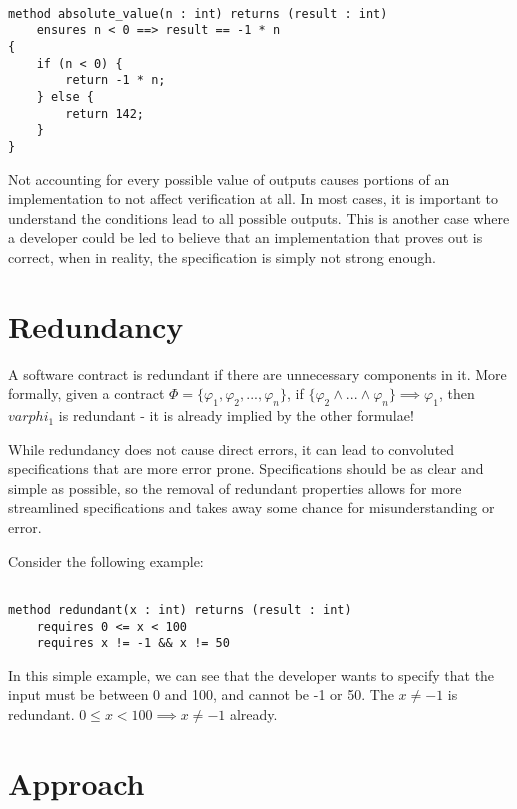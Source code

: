 \documentclass{article}
\begin{document}
\begin{lstlisting}

method absolute_value(n : int) returns (result : int)
    ensures n < 0 ==> result == -1 * n
{
    if (n < 0) {
        return -1 * n;
    } else {
        return 142;
    }
}

\end{lstlisting}

Not accounting for every possible value of outputs causes portions of an implementation to not affect verification at all. In
most cases, it is important to understand the conditions lead to all possible outputs. This is another case where a
developer could be led to believe that an implementation that proves out is correct, when in reality, the specification is
simply not strong enough.

\section{Redundancy}

A software contract is redundant if there are unnecessary components in it. More formally, given a contract
\(\Phi = \{\varphi_{1}, \varphi_{2}, ..., \varphi_{n}\}\), if \(\{\varphi_{2} \land ... \land \varphi_{n}\} \implies \varphi_{1}\), then
\(varphi_{1}\) is redundant - it is already implied by the other formulae!

While redundancy does not cause direct errors, it can lead to convoluted specifications that are more error prone. Specifications should be as
clear and simple as possible, so the removal of redundant properties allows for more streamlined specifications and takes away some chance
for misunderstanding or error.

Consider the following example:

\begin{lstlisting}

method redundant(x : int) returns (result : int)
    requires 0 <= x < 100
    requires x != -1 && x != 50

\end{lstlisting}

In this simple example, we can see that the developer wants to specify that the input must be between 0 and 100, and cannot be
-1 or 50. The \(x \neq -1\) is redundant. \(0 \leq x < 100 \implies x \neq -1\) already.

\section{Approach}
\end{document}
